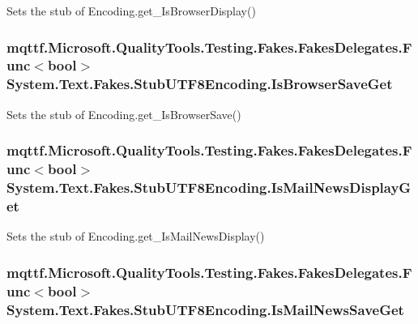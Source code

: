 Sets the stub of Encoding.\-get\-\_\-\-Is\-Browser\-Display()

\hypertarget{class_system_1_1_text_1_1_fakes_1_1_stub_u_t_f8_encoding_a5de81f70d991a03da87240a5891bb0fa}{
\subsubsection[{Is\-Browser\-Save\-Get}]{\setlength{\rightskip}{0pt plus 5cm}mqttf.\-Microsoft.\-Quality\-Tools.\-Testing.\-Fakes.\-Fakes\-Delegates.\-Func$<$bool$>$ System.\-Text.\-Fakes.\-Stub\-U\-T\-F8\-Encoding.\-Is\-Browser\-Save\-Get}}\label{class_system_1_1_text_1_1_fakes_1_1_stub_u_t_f8_encoding_a5de81f70d991a03da87240a5891bb0fa}


Sets the stub of Encoding.\-get\-\_\-\-Is\-Browser\-Save()

\hypertarget{class_system_1_1_text_1_1_fakes_1_1_stub_u_t_f8_encoding_a55000d9b0030a8130707838165510356}{
\subsubsection[{Is\-Mail\-News\-Display\-Get}]{\setlength{\rightskip}{0pt plus 5cm}mqttf.\-Microsoft.\-Quality\-Tools.\-Testing.\-Fakes.\-Fakes\-Delegates.\-Func$<$bool$>$ System.\-Text.\-Fakes.\-Stub\-U\-T\-F8\-Encoding.\-Is\-Mail\-News\-Display\-Get}}\label{class_system_1_1_text_1_1_fakes_1_1_stub_u_t_f8_encoding_a55000d9b0030a8130707838165510356}


Sets the stub of Encoding.\-get\-\_\-\-Is\-Mail\-News\-Display()

\hypertarget{class_system_1_1_text_1_1_fakes_1_1_stub_u_t_f8_encoding_a47c792f3915ab31750ee1d93f89029f6}{
\subsubsection[{Is\-Mail\-News\-Save\-Get}]{\setlength{\rightskip}{0pt plus 5cm}mqttf.\-Microsoft.\-Quality\-Tools.\-Testing.\-Fakes.\-Fakes\-Delegates.\-Func$<$bool$>$ System.\-Text.\-Fakes.\-Stub\-U\-T\-F8\-Encoding.\-Is\-Mail\-News\-Save\-Get}}\label{class_system_1_1_text_1_1_fakes_1_1_stub_u_t_f8_encoding_a47c792f3915ab31750ee1d93f89029f6}


